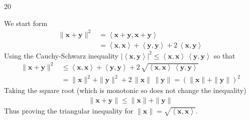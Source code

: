 \documentclass[answers]{sotonExamBoxes}    %
\newcommand{\len}[1]{\| #1 \|}
\newcommand{\inner}[2]{\left\langle #1, #2\right\rangle}
\begin{document}
\begin{question}{20}
\begin{qparts}
    \begin{answer}
      We start form
      \begin{align*}
        \len{\bm{x}+\bm{y}}^2
        &=  \inner{\bm{x} + \bm{y}}{\bm{x} + \bm{y}}
        \\
        &=  \inner{\bm{x}}{\bm{x}} + \inner{\bm{y}}{\bm{y}}
          + 2 \, \inner{\bm{x}}{\bm{y}}
      \end{align*}
      Using the Cauchy-Schwarz inequality $|\inner{\bm{x}}{\bm{y}}|^2
      \leq \inner{\bm{x}}{\bm{x}}\, \inner{\bm{y}}{\bm{y}}$ so that
      \begin{align*}
         \len{\bm{x}+\bm{y}}^2
        &\leq  \inner{\bm{x}}{\bm{x}} + \inner{\bm{y}}{\bm{y}}
          + 2 \, \sqrt{\inner{\bm{x}}{\bm{x}}\, \inner{\bm{y}}{\bm{y}}}
        \\
        &= \len{\bm{x}}^2 + \len{\bm{y}}^2 + 2 \,
          \len{\bm{x}}\,\len{\bm{y}}
        = \left( \len{\bm{x}} + \len{\bm{y}}\right)^2
      \end{align*}
      Taking the square root (which is monotonic so does not change
      the inequality)
      \begin{align*}
         \len{\bm{x}+\bm{y}} \leq  \len{\bm{x}} + \len{\bm{y}}
      \end{align*}
      Thus proving the triangular inequality for
      $\len{\bm{x}} = \sqrt{\inner{\bm{x}}{\bm{x}}}$. 
    \end{answer}
  \end{qparts}
\end{question}
\freshpage

\end{document}
